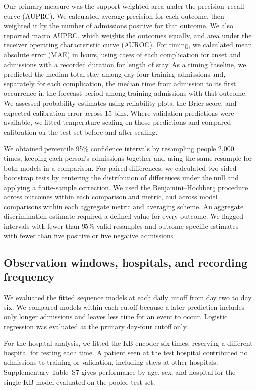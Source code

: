 Our primary measure was the support-weighted area under the precision--recall curve (AUPRC). We calculated average precision for each outcome, then weighted it by the number of admissions positive for that outcome. We also reported macro AUPRC, which weights the outcomes equally, and area under the receiver operating characteristic curve (AUROC). For timing, we calculated mean absolute error (MAE) in hours, using cases of each complication for onset and admissions with a recorded duration for length of stay. As a timing baseline, we predicted the median total stay among day-four training admissions and, separately for each complication, the median time from admission to its first occurrence in the forecast period among training admissions with that outcome. We assessed probability estimates using reliability plots, the Brier score, and expected calibration error across 15 bins. Where validation predictions were available, we fitted temperature scaling on those predictions and compared calibration on the test set before and after scaling.

We obtained percentile 95\% confidence intervals by resampling people 2,000 times, keeping each person's admissions together and using the same resample for both models in a comparison. For paired differences, we calculated two-sided bootstrap tests by centering the distribution of differences under the null and applying a finite-sample correction. We used the Benjamini--Hochberg procedure across outcomes within each comparison and metric, and across model comparisons within each aggregate metric and averaging scheme. An aggregate discrimination estimate required a defined value for every outcome. We flagged intervals with fewer than 95\% valid resamples and outcome-specific estimates with fewer than five positive or five negative admissions.

\subsection{Observation windows, hospitals, and recording frequency}
We evaluated the fitted sequence models at each daily cutoff from day two to day six. We compared models within each cutoff because a later prediction includes only longer admissions and leaves less time for an event to occur. Logistic regression was evaluated at the primary day-four cutoff only.

For the hospital analysis, we fitted the KB encoder six times, reserving a different hospital for testing each time. A patient seen at the test hospital contributed no admissions to training or validation, including stays at other hospitals. Supplementary Table~S7 gives performance by age, sex, and hospital for the single KB model evaluated on the pooled test set.

